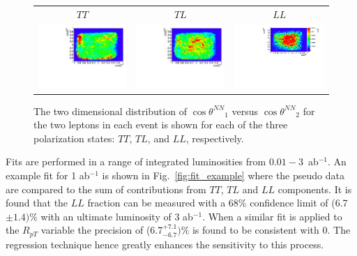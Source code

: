 \documentclass[aps,prl,twocolumn,showpacs,superscriptaddress,groupeaddress,floatfix]{revtex4}
\def\tsNN{\ensuremath{ \theta^{NN} }\xspace}
\def\ctsNN{\ensuremath{ \cos\tsNN }\xspace}
\begin{document}
\begin{figure}
\begin{tabular}{ccc}
$TT$ &$TL$&$LL$\\
\includegraphics[width=.28\textwidth,height=.18\textheight]{fig_02a.pdf}&
\includegraphics[width=.28\textwidth,height=.18\textheight]{fig_02b.pdf}&
\includegraphics[width=.39\textwidth,height=.18\textheight]{fig_02c.pdf}\\
\end{tabular}
\caption{\label{fig:2d_templates} The two dimensional distribution of $\ctsNN_1$ versus $\ctsNN_2$ for the two leptons in each event is shown for each of the three polarization states: $TT$, $TL$, and $LL$, respectively.}


\end{figure}


Fits are performed in a range of integrated luminosities from $0.01-3$~ab$^{-1}$. An example fit for 1 ab$^{-1}$ is shown in Fig.~\ref{fig:fit_example} where the pseudo data are compared to the sum of 
contributions from $TT$, $TL$ and $LL$ components. It is found that the $LL$ fraction can be measured with a 68\% confidence limit of (6.7$\pm 1.4)\%$ with an ultimate luminosity of 3 ab$^{-1}$. When a similar fit is applied to the $R_{pT}$ variable the precision of (6.7$^{+7.1}_{- 6.7})\%$ is found to be consistent with 0. The regression technique hence greatly enhances the sensitivity to this process.
\end{document}
